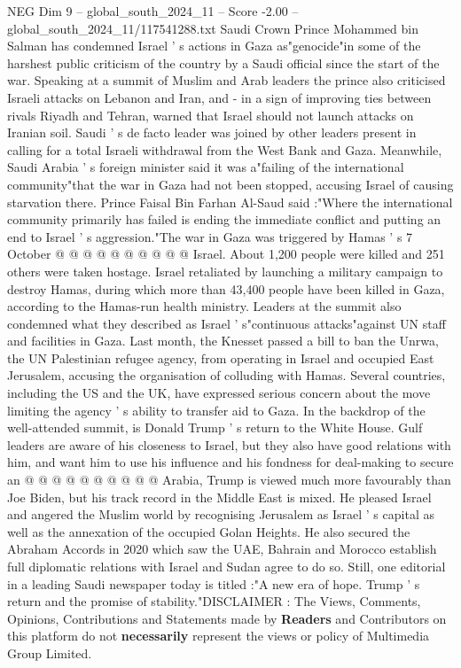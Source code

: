 \begin{textsample}{NEG Dim 9 – global\_south\_2024\_11 – Score -2.00 – global\_south\_2024\_11/117541288.txt}  \label{ex:f9_neg_309}
Saudi Crown Prince Mohammed bin Salman has condemned Israel ' s actions in Gaza as"genocide"in some of the harshest public criticism of the country by a Saudi official since the start of the war.
Speaking at a summit of Muslim and Arab leaders the prince also criticised Israeli attacks on Lebanon and Iran, and - in a sign of improving ties between rivals Riyadh and Tehran, warned that Israel should not launch attacks on Iranian soil.
Saudi ' s de facto leader was joined by other leaders present in calling for a total Israeli withdrawal from the West Bank and Gaza.
Meanwhile, Saudi Arabia ' s foreign minister said it was a"failing of the international community"that the war in Gaza had not been stopped, accusing Israel of causing starvation there.
Prince Faisal Bin Farhan Al-Saud said :"Where the international community primarily has failed is ending the immediate conflict and putting an end to Israel ' s aggression."The war in Gaza was triggered by Hamas ' s 7 October @ @ @ @ @ @ @ @ @ @ Israel.
About 1,200 people were killed and 251 others were taken hostage.
Israel retaliated by launching a military campaign to destroy Hamas, during which more than 43,400 people have been killed in Gaza, according to the Hamas-run health ministry.
Leaders at the summit also condemned what they described as Israel ' s"continuous attacks"against UN staff and facilities in Gaza.
Last month, the Knesset passed a bill to ban the Unrwa, the UN Palestinian refugee agency, from operating in Israel and occupied East Jerusalem, accusing the organisation of colluding with Hamas.
Several countries, including the US and the UK, have expressed serious concern about the move limiting the agency ' s ability to transfer aid to Gaza.
In the backdrop of the well-attended summit, is Donald Trump ' s return to the White House.
Gulf leaders are aware of his closeness to Israel, but they also have good relations with him, and want him to use his influence and his fondness for deal-making to secure an @ @ @ @ @ @ @ @ @ @ Arabia, Trump is viewed much more favourably than Joe Biden, but his track record in the Middle East is mixed.
He pleased Israel and angered the Muslim world by recognising Jerusalem as Israel ' s capital as well as the annexation of the occupied Golan Heights.
He also secured the Abraham Accords in 2020 which saw the UAE, Bahrain and Morocco establish full diplomatic relations with Israel and Sudan agree to do so.
Still, one editorial in a leading Saudi newspaper today is titled :"A new era of hope.
Trump ' s return and the promise of stability."DISCLAIMER : The Views, Comments, Opinions, Contributions and Statements made by \textbf{Readers} and Contributors on this platform do not \textbf{necessarily} represent the views or policy of Multimedia Group Limited.

\end{textsample}
